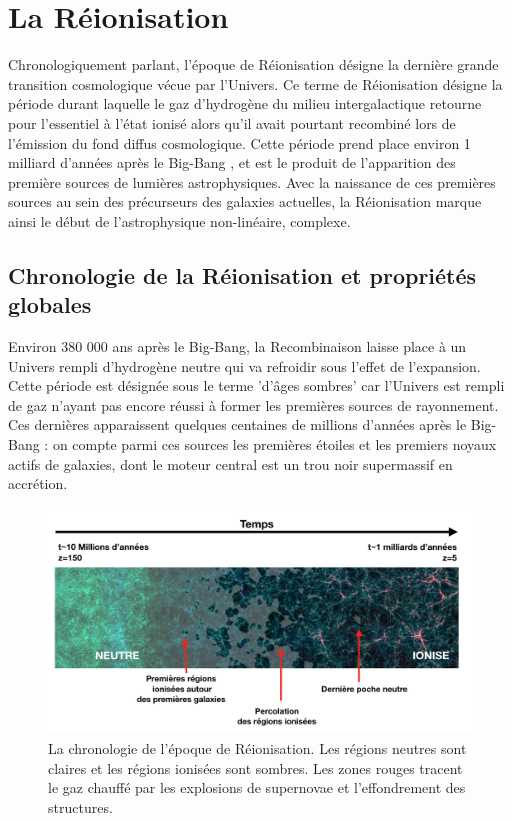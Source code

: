\chapter{La Réionisation}

Chronologiquement parlant, l'époque de Réionisation désigne la dernière grande transition cosmologique vécue par l'Univers. Ce terme de Réionisation désigne la période durant laquelle le gaz d'hydrogène du milieu intergalactique retourne pour l'essentiel à l'état ionisé alors qu'il avait pourtant recombiné lors de l'émission du fond diffus cosmologique. Cette période prend place environ 1 milliard d'années après le Big-Bang , et est le produit de l'apparition des première sources de lumières astrophysiques. Avec la naissance de ces premières sources au sein des précurseurs des galaxies actuelles, la Réionisation marque ainsi le début de l'astrophysique non-linéaire, complexe.

\section{Chronologie de la Réionisation et propriétés globales}
Environ 380 000 ans après le Big-Bang, la Recombinaison laisse place à un Univers rempli d'hydrogène neutre qui va refroidir sous l'effet de l'expansion. Cette période est désignée sous le terme 'd'âges sombres' car l'Univers est rempli de gaz n'ayant pas encore réussi à former les premières sources de rayonnement. Ces dernières apparaissent quelques centaines de millions d'années après le Big-Bang : on compte parmi ces sources les premières étoiles et les premiers noyaux actifs de galaxies, dont le moteur central est un trou noir supermassif en accrétion.

\begin{figure}[htbp]
	\centering
		\includegraphics[height=6cm]{figs/frisereion.png}
		\caption[Chronologie de la Réionisation]{La chronologie de l'époque de Réionisation. Les régions neutres sont claires et les régions ionisées sont sombres. Les zones rouges tracent le gaz chauffé par les explosions de supernovae et l'effondrement des structures.}
	\label{f:frisereion}
\end{figure}

